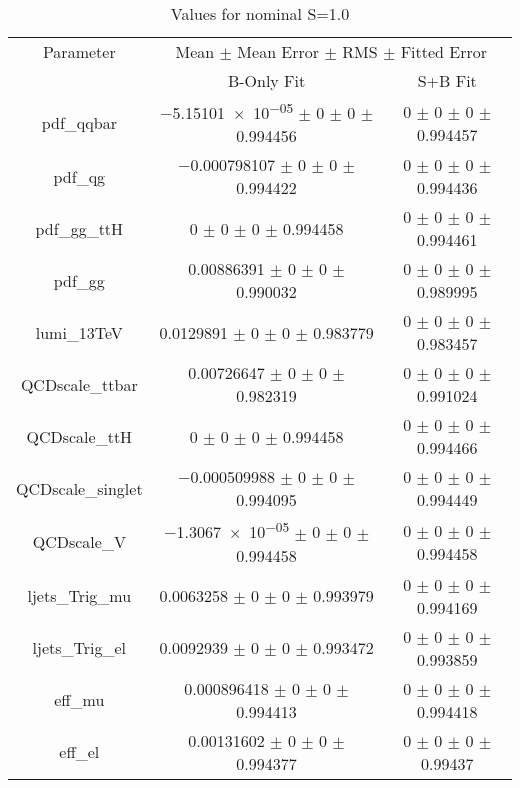 \begin{table}
\centering
\caption{Values for nominal S=1.0}
\begin{tabular}{ccc}
\toprule
Parameter 	& \multicolumn{2}{c}{Mean $\pm$ Mean Error $\pm$ RMS $\pm$ Fitted Error}\\
 	& B-Only Fit & S+B Fit\\
\midrule
pdf\_qqbar 	& \num{-5.15101e-05} $\pm$ \num{0} $\pm$ \num{0} $\pm$ \num{0.994456} 	& \num{0} $\pm$ \num{0} $\pm$ \num{0} $\pm$ \num{0.994457}\\
pdf\_qg 	& \num{-0.000798107} $\pm$ \num{0} $\pm$ \num{0} $\pm$ \num{0.994422} 	& \num{0} $\pm$ \num{0} $\pm$ \num{0} $\pm$ \num{0.994436}\\
pdf\_gg\_ttH 	& \num{0} $\pm$ \num{0} $\pm$ \num{0} $\pm$ \num{0.994458} 	& \num{0} $\pm$ \num{0} $\pm$ \num{0} $\pm$ \num{0.994461}\\
pdf\_gg 	& \num{0.00886391} $\pm$ \num{0} $\pm$ \num{0} $\pm$ \num{0.990032} 	& \num{0} $\pm$ \num{0} $\pm$ \num{0} $\pm$ \num{0.989995}\\
lumi\_13TeV 	& \num{0.0129891} $\pm$ \num{0} $\pm$ \num{0} $\pm$ \num{0.983779} 	& \num{0} $\pm$ \num{0} $\pm$ \num{0} $\pm$ \num{0.983457}\\
QCDscale\_ttbar 	& \num{0.00726647} $\pm$ \num{0} $\pm$ \num{0} $\pm$ \num{0.982319} 	& \num{0} $\pm$ \num{0} $\pm$ \num{0} $\pm$ \num{0.991024}\\
QCDscale\_ttH 	& \num{0} $\pm$ \num{0} $\pm$ \num{0} $\pm$ \num{0.994458} 	& \num{0} $\pm$ \num{0} $\pm$ \num{0} $\pm$ \num{0.994466}\\
QCDscale\_singlet 	& \num{-0.000509988} $\pm$ \num{0} $\pm$ \num{0} $\pm$ \num{0.994095} 	& \num{0} $\pm$ \num{0} $\pm$ \num{0} $\pm$ \num{0.994449}\\
QCDscale\_V 	& \num{-1.3067e-05} $\pm$ \num{0} $\pm$ \num{0} $\pm$ \num{0.994458} 	& \num{0} $\pm$ \num{0} $\pm$ \num{0} $\pm$ \num{0.994458}\\
ljets\_Trig\_mu 	& \num{0.0063258} $\pm$ \num{0} $\pm$ \num{0} $\pm$ \num{0.993979} 	& \num{0} $\pm$ \num{0} $\pm$ \num{0} $\pm$ \num{0.994169}\\
ljets\_Trig\_el 	& \num{0.0092939} $\pm$ \num{0} $\pm$ \num{0} $\pm$ \num{0.993472} 	& \num{0} $\pm$ \num{0} $\pm$ \num{0} $\pm$ \num{0.993859}\\
eff\_mu 	& \num{0.000896418} $\pm$ \num{0} $\pm$ \num{0} $\pm$ \num{0.994413} 	& \num{0} $\pm$ \num{0} $\pm$ \num{0} $\pm$ \num{0.994418}\\
eff\_el 	& \num{0.00131602} $\pm$ \num{0} $\pm$ \num{0} $\pm$ \num{0.994377} 	& \num{0} $\pm$ \num{0} $\pm$ \num{0} $\pm$ \num{0.99437}\\

\end{tabular}
\end{table}
